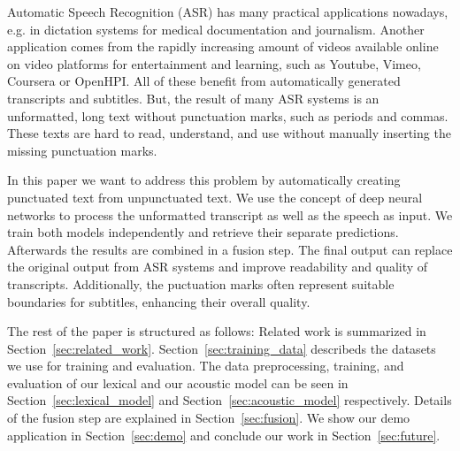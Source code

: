 Automatic Speech Recognition (ASR) has many practical applications nowadays, e.g. in dictation systems for medical documentation and journalism.
Another application comes from the rapidly increasing amount of videos available online on video platforms for entertainment and learning, such as Youtube, Vimeo, Coursera or OpenHPI.
All of these benefit from automatically generated transcripts and subtitles.
But, the result of many ASR systems is an unformatted, long text without punctuation marks, such as periods and commas.
These texts are hard to read, understand, and use without manually inserting the missing punctuation marks.

In this paper we want to address this problem by automatically creating punctuated text from unpunctuated text.
We use the concept of deep neural networks to process the unformatted transcript as well as the speech as input.
We train both models independently and retrieve their separate predictions.
Afterwards the results are combined in a fusion step.
The final output can replace the original output from ASR systems and improve readability and quality of transcripts.
Additionally, the puctuation marks often represent suitable boundaries for subtitles, enhancing their overall quality.

The rest of the paper is structured as follows:
Related work is summarized in Section~\ref{sec:related_work}.
Section~\ref{sec:training_data} describeds the datasets we use for training and evaluation.
The data preprocessing, training, and evaluation of our lexical and our acoustic model can be seen in Section~\ref{sec:lexical_model} and Section~\ref{sec:acoustic_model} respectively.
Details of the fusion step are explained in Section~\ref{sec:fusion}.
We show our demo application in Section~\ref{sec:demo} and conclude our work in Section~\ref{sec:future}.
